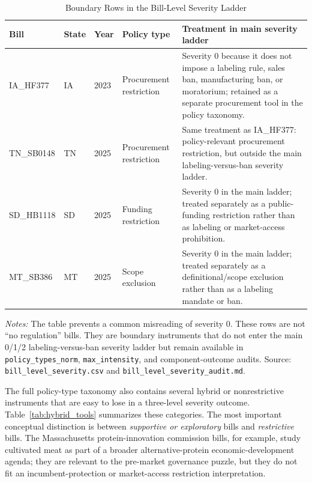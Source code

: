 \documentclass[12pt]{article}
\begin{document}
\begin{table}[htbp]
\centering
\begin{threeparttable}
\caption{Boundary Rows in the Bill-Level Severity Ladder}
\label{tab:severity_boundary}
\small
\begin{tabular}{llllp{}}
\toprule
Bill & State & Year & Policy type & Treatment in main severity ladder \\
\midrule
IA\_HF377 & IA & 2023 & Procurement restriction & Severity 0 because it does not impose a labeling rule, sales ban, manufacturing ban, or moratorium; retained as a separate procurement tool in the policy taxonomy. \\
TN\_SB0148 & TN & 2025 & Procurement restriction & Same treatment as IA\_HF377: policy-relevant procurement restriction, but outside the main labeling-versus-ban severity ladder. \\
SD\_HB1118 & SD & 2025 & Funding restriction & Severity 0 in the main ladder; treated separately as a public-funding restriction rather than as labeling or market-access prohibition. \\
MT\_SB386 & MT & 2025 & Scope exclusion & Severity 0 in the main ladder; treated separately as a definitional/scope exclusion rather than as a labeling mandate or ban. \\
\bottomrule
\end{tabular}
\begin{tablenotes}[flushleft]
\footnotesize
\item \textit{Notes:} The table prevents a common misreading of severity 0.  These rows are not ``no regulation'' bills.  They are boundary instruments that do not enter the main 0/1/2 labeling-versus-ban severity ladder but remain available in \texttt{policy\_types\_norm}, \texttt{max\_intensity}, and component-outcome audits.  Source: \texttt{bill\_level\_severity.csv} and \texttt{bill\_level\_severity\_audit.md}.
\end{tablenotes}
\end{threeparttable}
\end{table}

The full policy-type taxonomy also contains several hybrid or nonrestrictive instruments that are easy to lose in a three-level severity outcome.  Table~\ref{tab:hybrid_tools} summarizes these categories.  The most important conceptual distinction is between \emph{supportive or exploratory} bills and \emph{restrictive} bills.  The Massachusetts protein-innovation commission bills, for example, study cultivated meat as part of a broader alternative-protein economic-development agenda; they are relevant to the pre-market governance puzzle, but they do not fit an incumbent-protection or market-access restriction interpretation.
\end{document}
